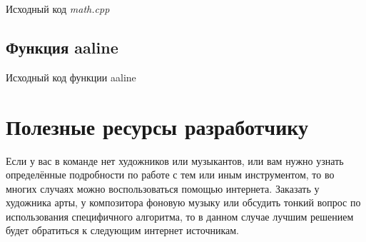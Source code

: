 \pagebreak

\begin{center}
    Исходный код \emph{math.cpp}
\end{center}


\pagebreak

\subsection{Функция aaline}
\label{code:aaline}
\begin{center}
    Исходный код функции aaline
\end{center}


\pagebreak

\section{Полезные ресурсы разработчику}
Если у вас в команде нет художников или музыкантов, или вам нужно узнать определённые подробности по работе 
с тем или иным инструментом, то во многих случаях можно воспользоваться помощью интернета. Заказать у 
художника арты, у композитора фоновую музыку или обсудить тонкий вопрос по использования специфичного 
алгоритма, то в данном случае лучшим решением будет обратиться к следующим интернет источникам.


